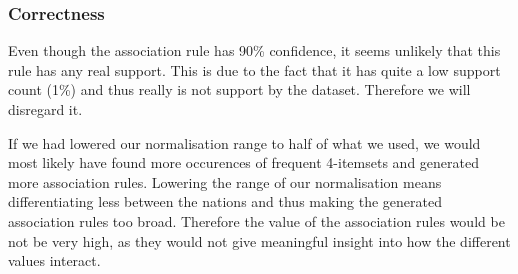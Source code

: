 \subsubsection*{Correctness}
\label{Res_FP_Cor}
Even though the association rule has 90\% confidence, it seems unlikely that this rule has any real support. This is due to the fact that it has quite a low support count (1\%) and thus really is not support by the dataset. Therefore we will disregard it.

If we had lowered our normalisation range to half of what we used, we would most likely have found more occurences of frequent 4-itemsets and generated more association rules. Lowering the range of our normalisation means differentiating less between the nations and thus making the generated association rules too broad. Therefore the value of the association rules would be not be very high, as they would not give meaningful insight into how the different values interact.
